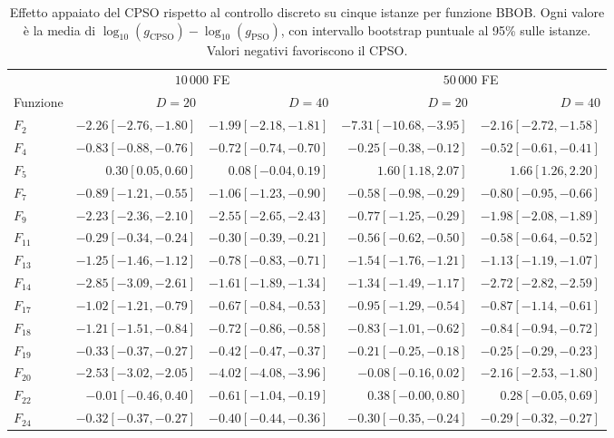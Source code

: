 \begin{table}[htbp]
\centering\small
\caption{Effetto appaiato del CPSO rispetto al controllo discreto su cinque istanze per funzione BBOB. Ogni valore è la media di $\log_{10}(g_{\mathrm{CPSO}})-\log_{10}(g_{\mathrm{PSO}})$, con intervallo bootstrap puntuale al 95\% sulle istanze. Valori negativi favoriscono il CPSO.}
\label{tab:study3-bbob-matched-effects}
\begin{tabular}{@{}lrrrr@{}}
\toprule
 & \multicolumn{2}{c}{$10\,000$ FE} & \multicolumn{2}{c}{$50\,000$ FE} \\
\cmidrule(lr){2-3}\cmidrule(l){4-5}
Funzione & $D=20$ & $D=40$ & $D=20$ & $D=40$ \\
\midrule
$F_{2}$ & $-2.26 [-2.76, -1.80]$ & $-1.99 [-2.18, -1.81]$ & $-7.31 [-10.68, -3.95]$ & $-2.16 [-2.72, -1.58]$ \\
$F_{4}$ & $-0.83 [-0.88, -0.76]$ & $-0.72 [-0.74, -0.70]$ & $-0.25 [-0.38, -0.12]$ & $-0.52 [-0.61, -0.41]$ \\
$F_{5}$ & $0.30 [0.05, 0.60]$ & $0.08 [-0.04, 0.19]$ & $1.60 [1.18, 2.07]$ & $1.66 [1.26, 2.20]$ \\
$F_{7}$ & $-0.89 [-1.21, -0.55]$ & $-1.06 [-1.23, -0.90]$ & $-0.58 [-0.98, -0.29]$ & $-0.80 [-0.95, -0.66]$ \\
$F_{9}$ & $-2.23 [-2.36, -2.10]$ & $-2.55 [-2.65, -2.43]$ & $-0.77 [-1.25, -0.29]$ & $-1.98 [-2.08, -1.89]$ \\
$F_{11}$ & $-0.29 [-0.34, -0.24]$ & $-0.30 [-0.39, -0.21]$ & $-0.56 [-0.62, -0.50]$ & $-0.58 [-0.64, -0.52]$ \\
$F_{13}$ & $-1.25 [-1.46, -1.12]$ & $-0.78 [-0.83, -0.71]$ & $-1.54 [-1.76, -1.21]$ & $-1.13 [-1.19, -1.07]$ \\
$F_{14}$ & $-2.85 [-3.09, -2.61]$ & $-1.61 [-1.89, -1.34]$ & $-1.34 [-1.49, -1.17]$ & $-2.72 [-2.82, -2.59]$ \\
$F_{17}$ & $-1.02 [-1.21, -0.79]$ & $-0.67 [-0.84, -0.53]$ & $-0.95 [-1.29, -0.54]$ & $-0.87 [-1.14, -0.61]$ \\
$F_{18}$ & $-1.21 [-1.51, -0.84]$ & $-0.72 [-0.86, -0.58]$ & $-0.83 [-1.01, -0.62]$ & $-0.84 [-0.94, -0.72]$ \\
$F_{19}$ & $-0.33 [-0.37, -0.27]$ & $-0.42 [-0.47, -0.37]$ & $-0.21 [-0.25, -0.18]$ & $-0.25 [-0.29, -0.23]$ \\
$F_{20}$ & $-2.53 [-3.02, -2.05]$ & $-4.02 [-4.08, -3.96]$ & $-0.08 [-0.16, 0.02]$ & $-2.16 [-2.53, -1.80]$ \\
$F_{22}$ & $-0.01 [-0.46, 0.40]$ & $-0.61 [-1.04, -0.19]$ & $0.38 [-0.00, 0.80]$ & $0.28 [-0.05, 0.69]$ \\
$F_{24}$ & $-0.32 [-0.37, -0.27]$ & $-0.40 [-0.44, -0.36]$ & $-0.30 [-0.35, -0.24]$ & $-0.29 [-0.32, -0.27]$ \\
\bottomrule
\end{tabular}
\end{table}
